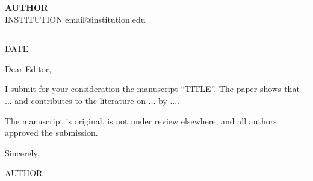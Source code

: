 \documentclass[11pt,a4paper]{article}
\begin{document}
{\large\bfseries {{AUTHOR}}}\\
{\small {{INSTITUTION}} \textbullet{} email@institution.edu}\\[-0.4em]
{\color{tocaHoney}\rule{\linewidth}{1.2pt}}

\hfill {{DATE}}

Dear Editor,

I submit for your consideration the manuscript ``{{TITLE}}''. The paper shows that ... and contributes to the literature on ... by ....

The manuscript is original, is not under review elsewhere, and all authors approved the submission.

Sincerely,

\vspace{2.5em}
{{AUTHOR}}
\end{document}

